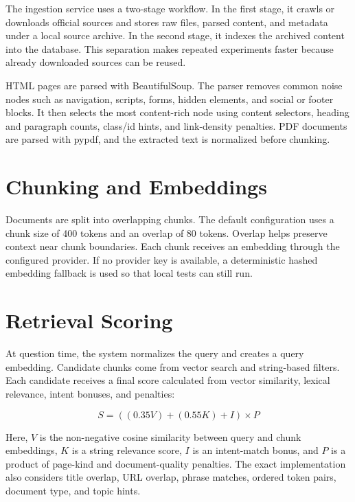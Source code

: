 The ingestion service uses a two-stage workflow. In the first stage, it crawls or downloads official sources and stores raw files, parsed content, and metadata under a local source archive. In the second stage, it indexes the archived content into the database. This separation makes repeated experiments faster because already downloaded sources can be reused.

HTML pages are parsed with BeautifulSoup. The parser removes common noise nodes such as navigation, scripts, forms, hidden elements, and social or footer blocks. It then selects the most content-rich node using content selectors, heading and paragraph counts, class/id hints, and link-density penalties. PDF documents are parsed with pypdf, and the extracted text is normalized before chunking.

\section{Chunking and Embeddings}

Documents are split into overlapping chunks. The default configuration uses a chunk size of 400 tokens and an overlap of 80 tokens. Overlap helps preserve context near chunk boundaries. Each chunk receives an embedding through the configured provider. If no provider key is available, a deterministic hashed embedding fallback is used so that local tests can still run.

\section{Retrieval Scoring}

At question time, the system normalizes the query and creates a query embedding. Candidate chunks come from vector search and string-based filters. Each candidate receives a final score calculated from vector similarity, lexical relevance, intent bonuses, and penalties:

\begin{equation}
S = ((0.35V) + (0.55K) + I) \times P
\end{equation}

Here, $V$ is the non-negative cosine similarity between query and chunk embeddings, $K$ is a string relevance score, $I$ is an intent-match bonus, and $P$ is a product of page-kind and document-quality penalties. The exact implementation also considers title overlap, URL overlap, phrase matches, ordered token pairs, document type, and topic hints.

